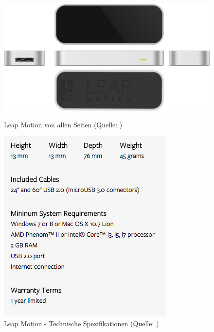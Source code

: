 \begin{figure}[H]
  \begin{minipage}[b]{0.45\linewidth}
    \centering
   	\includegraphics[width=1.0\linewidth]{images/analysis/leap_360_view.png}
   	\caption[Leap Motion von allen Seiten]{Leap Motion von allen Seiten (Quelle: )}
  \end{minipage}%
  \hspace{.1\linewidth}
  \begin{minipage}[b]{0.45\linewidth}
    \centering
	\includegraphics[width=1.0\linewidth]{images/analysis/leap_technical_specifiaction.png}
	\caption[Leap Motion - Technische Spezifikationen]{Leap Motion - Technische Spezifikationen (Quelle: )}
  \end{minipage}
\end{figure}

